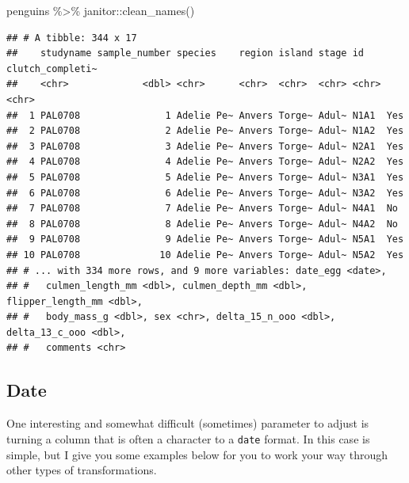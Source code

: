 \documentclass[
]{book}
\newenvironment{Shaded}{\begin{snugshade}}{\end{snugshade}}
\newcommand{\FunctionTok}[1]{\textcolor[rgb]{0.00,0.00,0.00}{#1}}
\newcommand{\NormalTok}[1]{#1}
\newcommand{\OtherTok}[1]{\textcolor[rgb]{0.56,0.35,0.01}{#1}}
\newcommand{\SpecialCharTok}[1]{\textcolor[rgb]{0.00,0.00,0.00}{#1}}
\begin{document}
\begin{Shaded}
\begin{Highlighting}[]
\NormalTok{penguins }\SpecialCharTok{\%\textgreater{}\%} 
\NormalTok{  janitor}\SpecialCharTok{::}\FunctionTok{clean\_names}\NormalTok{()}
\end{Highlighting}
\end{Shaded}

\begin{verbatim}
## # A tibble: 344 x 17
##    studyname sample_number species    region island stage id    clutch_completi~
##    <chr>             <dbl> <chr>      <chr>  <chr>  <chr> <chr> <chr>           
##  1 PAL0708               1 Adelie Pe~ Anvers Torge~ Adul~ N1A1  Yes             
##  2 PAL0708               2 Adelie Pe~ Anvers Torge~ Adul~ N1A2  Yes             
##  3 PAL0708               3 Adelie Pe~ Anvers Torge~ Adul~ N2A1  Yes             
##  4 PAL0708               4 Adelie Pe~ Anvers Torge~ Adul~ N2A2  Yes             
##  5 PAL0708               5 Adelie Pe~ Anvers Torge~ Adul~ N3A1  Yes             
##  6 PAL0708               6 Adelie Pe~ Anvers Torge~ Adul~ N3A2  Yes             
##  7 PAL0708               7 Adelie Pe~ Anvers Torge~ Adul~ N4A1  No              
##  8 PAL0708               8 Adelie Pe~ Anvers Torge~ Adul~ N4A2  No              
##  9 PAL0708               9 Adelie Pe~ Anvers Torge~ Adul~ N5A1  Yes             
## 10 PAL0708              10 Adelie Pe~ Anvers Torge~ Adul~ N5A2  Yes             
## # ... with 334 more rows, and 9 more variables: date_egg <date>,
## #   culmen_length_mm <dbl>, culmen_depth_mm <dbl>, flipper_length_mm <dbl>,
## #   body_mass_g <dbl>, sex <chr>, delta_15_n_ooo <dbl>, delta_13_c_ooo <dbl>,
## #   comments <chr>
\end{verbatim}

\hypertarget{date}{%
\subsection{Date}\label{date}}

One interesting and somewhat difficult (sometimes) parameter to adjust is turning a column that is often a character to a \texttt{date} format.
In this case is simple, but I give you some examples below for you to work your way through other types of transformations.

\begin{Shaded}
\end{Shaded}
\end{document}
